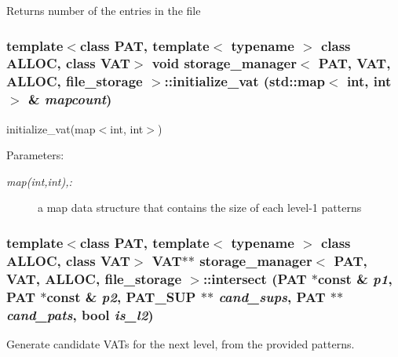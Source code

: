 Returns number of the entries in the file 
\subsubsection{\setlength{\rightskip}{0pt plus 5cm}template$<$class PAT, template$<$ typename $>$ class ALLOC, class VAT$>$ void \bf{storage\_\-manager}$<$ PAT, VAT, ALLOC, \bf{file\_\-storage} $>$::initialize\_\-vat (std::map$<$ int, int $>$ \& {\em mapcount})\hspace{0.3cm}{\tt  [inline]}}\label{classstorage__manager_3_01PAT_00_01VAT_00_01ALLOC_00_01file__storage_01_4_55c1a321d084edaf8483689e6fc8836d}


initialize\_\-vat(map$<$int, int$>$) \begin{Desc}
\item[Parameters:]
\begin{description}
\item[{\em map(int,int),:}]a map data structure that contains the size of each level-1 patterns \end{description}
\end{Desc}
\subsubsection{\setlength{\rightskip}{0pt plus 5cm}template$<$class PAT, template$<$ typename $>$ class ALLOC, class VAT$>$ VAT$\ast$$\ast$ \bf{storage\_\-manager}$<$ PAT, VAT, ALLOC, \bf{file\_\-storage} $>$::intersect (PAT $\ast$const \& {\em p1}, PAT $\ast$const \& {\em p2}, \bf{PAT\_\-SUP} $\ast$$\ast$ {\em cand\_\-sups}, PAT $\ast$$\ast$ {\em cand\_\-pats}, bool {\em is\_\-l2})\hspace{0.3cm}{\tt  [inline]}}\label{classstorage__manager_3_01PAT_00_01VAT_00_01ALLOC_00_01file__storage_01_4_45108861ac9da5155a57713a1a87f01f}


Generate candidate VATs for the next level, from the provided patterns. 
